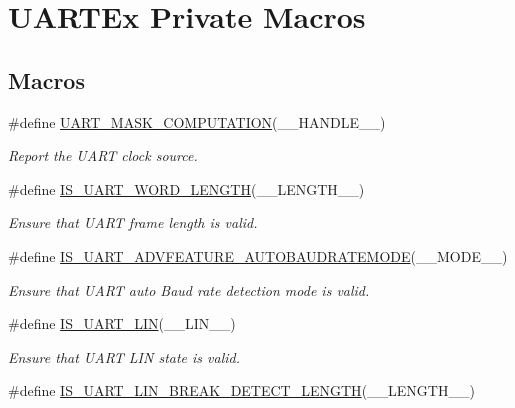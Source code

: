 \hypertarget{group___u_a_r_t_ex___private___macros}{}\section{U\+A\+R\+T\+Ex Private Macros}
\label{group___u_a_r_t_ex___private___macros}
\subsection*{Macros}
\begin{DoxyCompactItemize}
\item 
\#define \hyperlink{group___u_a_r_t_ex___private___macros_gad9330184a8bd9399a36bcc93215a50d1}{U\+A\+R\+T\+\_\+\+M\+A\+S\+K\+\_\+\+C\+O\+M\+P\+U\+T\+A\+T\+I\+ON}(\+\_\+\+\_\+\+H\+A\+N\+D\+L\+E\+\_\+\+\_\+)
\begin{DoxyCompactList}\small\item\em Report the U\+A\+RT clock source. \end{DoxyCompactList}\item 
\#define \hyperlink{group___u_a_r_t_ex___private___macros_gaf856254e5a61d2ee81086918bffabde5}{I\+S\+\_\+\+U\+A\+R\+T\+\_\+\+W\+O\+R\+D\+\_\+\+L\+E\+N\+G\+TH}(\+\_\+\+\_\+\+L\+E\+N\+G\+T\+H\+\_\+\+\_\+)
\begin{DoxyCompactList}\small\item\em Ensure that U\+A\+RT frame length is valid. \end{DoxyCompactList}\item 
\#define \hyperlink{group___u_a_r_t_ex___private___macros_ga88f07bdfe1fcdff17edbbba2f196110d}{I\+S\+\_\+\+U\+A\+R\+T\+\_\+\+A\+D\+V\+F\+E\+A\+T\+U\+R\+E\+\_\+\+A\+U\+T\+O\+B\+A\+U\+D\+R\+A\+T\+E\+M\+O\+DE}(\+\_\+\+\_\+\+M\+O\+D\+E\+\_\+\+\_\+)
\begin{DoxyCompactList}\small\item\em Ensure that U\+A\+RT auto Baud rate detection mode is valid. \end{DoxyCompactList}\item 
\#define \hyperlink{group___u_a_r_t_ex___private___macros_ga13d7f9876db68d9d6316204a8a2588de}{I\+S\+\_\+\+U\+A\+R\+T\+\_\+\+L\+IN}(\+\_\+\+\_\+\+L\+I\+N\+\_\+\+\_\+)
\begin{DoxyCompactList}\small\item\em Ensure that U\+A\+RT L\+IN state is valid. \end{DoxyCompactList}\item 
\#define \hyperlink{group___u_a_r_t_ex___private___macros_gac8ac0d0dc7fad5edf53150ce05d902ee}{I\+S\+\_\+\+U\+A\+R\+T\+\_\+\+L\+I\+N\+\_\+\+B\+R\+E\+A\+K\+\_\+\+D\+E\+T\+E\+C\+T\+\_\+\+L\+E\+N\+G\+TH}(\+\_\+\+\_\+\+L\+E\+N\+G\+T\+H\+\_\+\+\_\+)

\end{DoxyCompactItemize}
